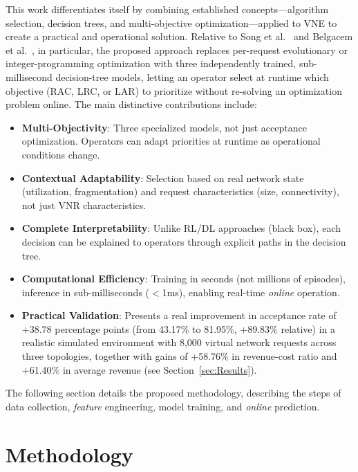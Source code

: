 \documentclass[runningheads]{llncs}
\begin{document}
This work differentiates itself by combining established concepts---algorithm selection, decision trees, and multi-objective optimization---applied to VNE to create a practical and operational solution. Relative to Song et al.~\cite{song2020multiobjective} and Belgacem et al.~\cite{belgacem2016multiobjective}, in particular, the proposed approach replaces per-request evolutionary or integer-programming optimization with three independently trained, sub-millisecond decision-tree models, letting an operator select at runtime which objective (RAC, LRC, or LAR) to prioritize without re-solving an optimization problem online. The main distinctive contributions include:
\begin{itemize}
    \item \textbf{Multi-Objectivity}: Three specialized models, not just acceptance optimization. Operators can adapt priorities at runtime as operational conditions change.

    \item \textbf{Contextual Adaptability}: Selection based on real network state (utilization, fragmentation) and request characteristics (size, connectivity), not just VNR characteristics.

    \item \textbf{Complete Interpretability}: Unlike RL/DL approaches (black box), each decision can be explained to operators through explicit paths in the decision tree.

    \item \textbf{Computational Efficiency}: Training in seconds (not millions of episodes), inference in sub-milliseconds ($<$1ms), enabling real-time \textit{online} operation.

    \item \textbf{Practical Validation}: Presents a real improvement in acceptance rate of +38.78 percentage points (from 43.17\% to 81.95\%, +89.83\% relative) in a realistic simulated environment with 8,000 virtual network requests across three topologies, together with gains of +58.76\% in revenue-cost ratio and +61.40\% in average revenue (see Section~\ref{sec:Results}).
\end{itemize}

The following section details the proposed methodology, describing the steps of data collection, \textit{feature} engineering, model training, and \textit{online} prediction.

\section{Methodology}
\label{sec:Proposal}
\end{document}
